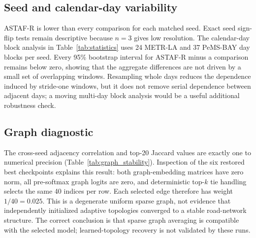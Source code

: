 \documentclass[fleqn,10pt]{wlscirep}
\begin{document}
\subsection{Seed and calendar-day variability}
ASTAF-R is lower than every comparison for each matched seed. Exact seed
sign-flip tests remain descriptive because $n=3$ gives low resolution. The
calendar-day block analysis in Table~\ref{tab:statistics} uses 24 METR-LA and
37 PeMS-BAY day blocks per seed. Every 95\% bootstrap interval for ASTAF-R minus
a comparison remains below zero, showing that the aggregate differences are
not driven by a small set of overlapping windows.
Resampling whole days reduces the dependence induced by stride-one windows,
but it does not remove serial dependence between adjacent days; a moving
multi-day block analysis would be a useful additional robustness check.

\begin{table}[t]
\centering
\caption{Calendar-day-block MAE differences. Negative values favor ASTAF-R;
intervals are 10,000-repetition clustered day-bootstrap intervals.}
\label{tab:statistics}
\resizebox{\textwidth}{!}{}
\end{table}

\subsection{Graph diagnostic}
\label{subsec:graph_robustness}
The cross-seed adjacency correlation and top-20 Jaccard values are exactly one
to numerical precision (Table~\ref{tab:graph_stability}). Inspection of the
six restored best checkpoints explains this result: both graph-embedding
matrices have zero norm, all pre-softmax graph logits are zero, and deterministic
top-$k$ tie handling selects the same 40 indices per row. Each selected edge
therefore has weight $1/40=0.025$. This is a degenerate uniform sparse graph,
not evidence that independently initialized adaptive topologies converged to a
stable road-network structure. The correct conclusion is that sparse graph
averaging is compatible with the selected model; learned-topology recovery is
not validated by these runs.

\begin{table}[t]
\centering
\caption{Cross-seed graph diagnostics reported without rounding away the exact
identity. The identity is explained by zero graph embeddings and uniform
top-40 weights.}
\label{tab:graph_stability}
\resizebox{\columnwidth}{!}{}
\end{table}
\end{document}
